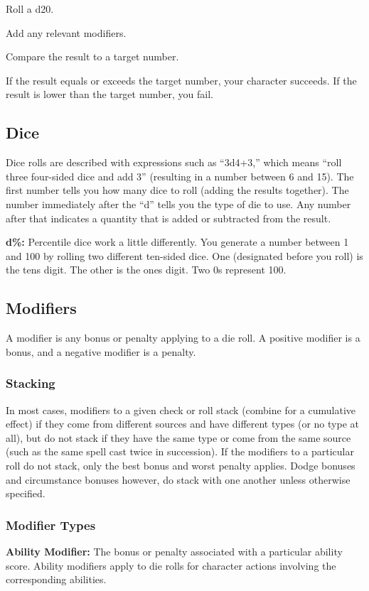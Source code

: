 \begin{itemize*}
\item Roll a d20.
\item Add any relevant modifiers.
\item Compare the result to a target number.
\item If the result equals or exceeds the target number, your character succeeds. If the result is lower than the target number, you fail.
\end{itemize*}

\subsection{Dice}
Dice rolls are described with expressions such as ``3d4+3,'' which means ``roll three four-sided dice and add 3'' (resulting in a number between 6 and 15). The first number tells you how many dice to roll (adding the results together). The number immediately after the ``d'' tells you the type of die to use. Any number after that indicates a quantity that is added or subtracted from the result.

\textbf{d\%:} Percentile dice work a little differently. You generate a number between 1 and 100 by rolling two different ten-sided dice. One (designated before you roll) is the tens digit. The other is the ones digit. Two 0s represent 100.

\subsection{Modifiers}
A modifier is any bonus or penalty applying to a die roll. A positive modifier is a bonus, and a negative modifier is a penalty.

\subsubsection{Stacking}
In most cases, modifiers to a given check or roll stack (combine for a cumulative effect) if they come from different sources and have different types (or no type at all), but do not stack if they have the same type or come from the same source (such as the same spell cast twice in succession). If the modifiers to a particular roll do not stack, only the best bonus and worst penalty applies. Dodge bonuses and circumstance bonuses however, do stack with one another unless otherwise specified.


\subsubsection{Modifier Types}
\textbf{Ability Modifier:} The bonus or penalty associated with a particular ability score. Ability modifiers apply to die rolls for character actions involving the corresponding abilities.

